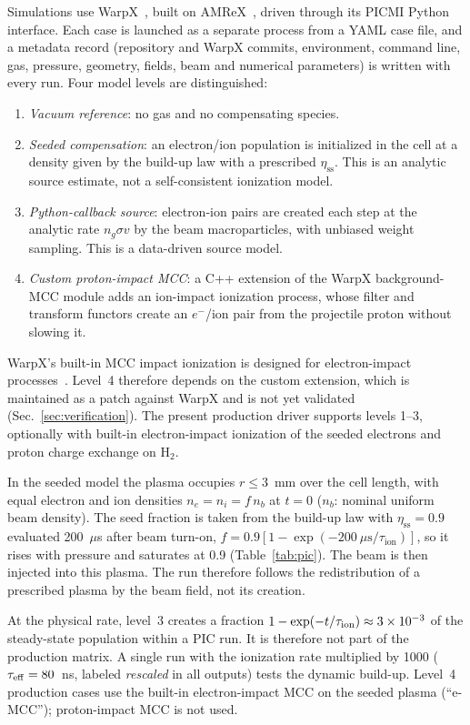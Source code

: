 \documentclass[aps,prab,10pt,twocolumn,superscriptaddress,showpacs,floatfix]{revtex4-2}
\newcommand{\Htwo}{\mathrm{H}_2}
\begin{document}
Simulations use WarpX~\cite{Vay2021}, built on AMReX~\cite{Zhang2019}, driven through
its PICMI Python interface. Each case is launched as a separate process from a YAML case
file, and a metadata record (repository and WarpX commits, environment, command line,
gas, pressure, geometry, fields, beam and numerical parameters) is written with every
run. Four model levels are distinguished:
\begin{enumerate}
\item \emph{Vacuum reference}: no gas and no compensating species.
\item \emph{Seeded compensation}: an electron/ion population is initialized in the
cell at a density given by the build-up law with a prescribed $\eta_{\mathrm{ss}}$.
This is an analytic source estimate, not a self-consistent ionization model.
\item \emph{Python-callback source}: electron-ion pairs are created each step at the
analytic rate $n_g\sigma v$ by the beam macroparticles, with unbiased weight sampling.
This is a data-driven source model.
\item \emph{Custom proton-impact MCC}: a C++ extension of the WarpX background-MCC
module adds an ion-impact ionization process, whose filter and transform functors
create an $e^-$/ion pair from the projectile proton without slowing it.
\end{enumerate}
WarpX's built-in MCC impact ionization is designed for electron-impact
processes~\cite{Vahedi1995}. Level~4 therefore depends on the custom extension, which is
maintained as a patch against WarpX and is not yet validated (Sec.~\ref{sec:verification}).
The present production driver supports levels 1--3, optionally with built-in
electron-impact ionization of the seeded electrons and proton charge exchange on $\Htwo$.

In the seeded model the plasma occupies $r\le3$~mm over the cell length, with equal
electron and ion densities $n_e=n_i=f\,n_b$ at $t=0$ ($n_b$: nominal uniform beam density).
The seed fraction is taken from the build-up law with $\eta_{\mathrm{ss}}=0.9$ evaluated
200~$\mu$s after beam turn-on, $f=0.9[1-\exp(-200~\mu\mathrm{s}/\tau_{\mathrm{ion}})]$, so
it rises with pressure and saturates at 0.9 (Table~\ref{tab:pic}). The beam is then injected
into this plasma. The run therefore follows the redistribution of a prescribed plasma by the
beam field, not its creation.

At the physical rate, level~3 creates a fraction $1-\exp(-t/\tau_{\mathrm{ion}})\approx
3\times10^{-3}$ of the steady-state population within a PIC run. It is therefore not part of
the production matrix. A single run with the ionization rate multiplied by 1000
($\tau_{\mathrm{eff}}=80$~ns, labeled \emph{rescaled} in all outputs)
tests the dynamic build-up. Level~4 production cases use the built-in electron-impact MCC
on the seeded plasma (``e-MCC''); proton-impact MCC is not used.
\end{document}
